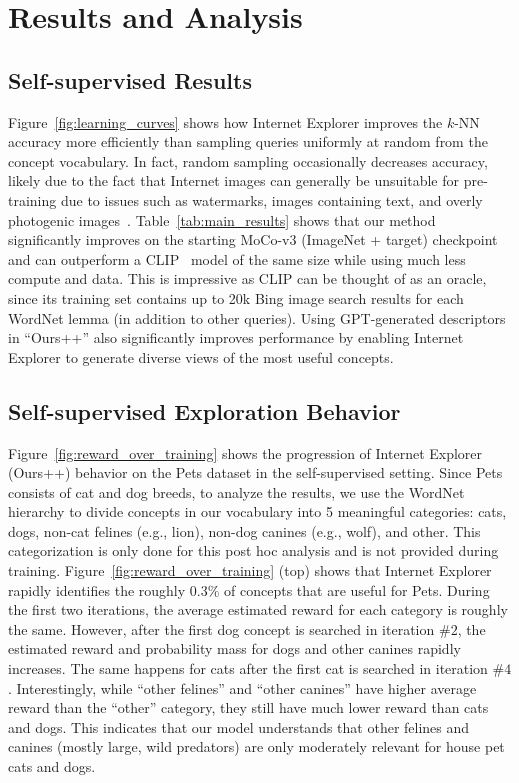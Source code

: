 \section{Results and Analysis}
\subsection{Self-supervised Results}
Figure~\ref{fig:learning_curves} shows how Internet Explorer improves the $k$-NN accuracy more efficiently than sampling queries uniformly at random from the concept vocabulary. In fact, random sampling occasionally decreases accuracy, likely due to the fact that Internet images can generally be unsuitable for pre-training due to issues such as watermarks, images containing text, and overly photogenic images~\cite{mezuman2012learning,chen2015webly}. Table~\ref{tab:main_results} shows that our method significantly improves on the starting MoCo-v3 (ImageNet + target) checkpoint and can outperform a CLIP~\cite{radford2021learning} model of the same size while using much less compute and data. This is impressive as CLIP can be thought of as an oracle, since its training set contains up to 20k Bing image search results for each WordNet lemma (in addition to other queries).
Using GPT-generated descriptors in ``Ours++'' also significantly improves performance by enabling Internet Explorer to generate diverse views of the most useful concepts. 

\subsection{Self-supervised Exploration Behavior}
Figure~\ref{fig:reward_over_training} shows the progression of Internet Explorer (Ours++) behavior on the Pets dataset in the self-supervised setting. Since Pets consists of cat and dog breeds, to analyze the results, we use the WordNet hierarchy to divide concepts in our vocabulary into 5 meaningful categories: cats, dogs, non-cat felines (e.g., lion), non-dog canines (e.g., wolf), and other. This categorization is only done for this post hoc analysis and is not provided during training. Figure~\ref{fig:reward_over_training} (top) shows that
Internet Explorer rapidly identifies the roughly $0.3\%$ of concepts that are useful for Pets. During the first two iterations, the average estimated reward for each category is roughly the same. However, after the first dog concept is searched in iteration $\#2$, the estimated reward and probability mass for dogs and other canines rapidly increases. The same happens for cats after the first cat is searched in iteration $\#4$. Interestingly, while ``other felines'' and ``other canines''  have higher average reward than the ``other'' category, they still have much lower reward than cats and dogs. This indicates that our model understands that other felines and canines (mostly large, wild predators) are only moderately relevant for house pet cats and dogs. 

